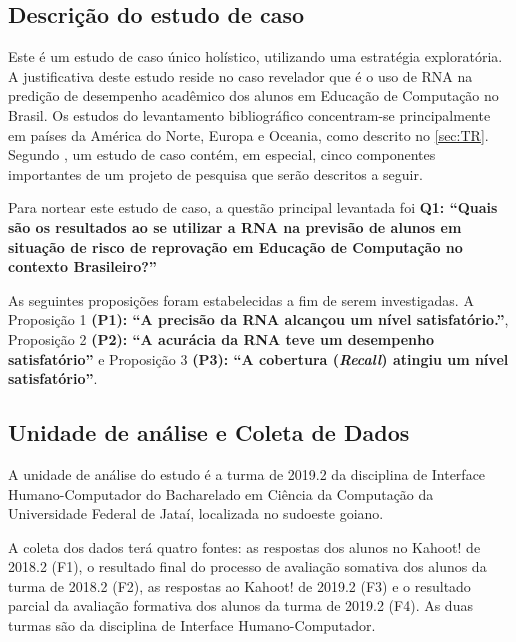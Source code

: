 \subsection{Descrição do estudo de caso}
Este é um estudo de caso único holístico, utilizando uma estratégia exploratória. A justiﬁcativa deste estudo reside no caso revelador que é o uso de RNA na predição de desempenho acadêmico dos alunos em Educação de Computação no Brasil. Os estudos do levantamento bibliográfico concentram-se principalmente em países da América do Norte, Europa e Oceania, como descrito no \autoref{sec:TR}.
Segundo , um estudo de caso contém, em especial, cinco componentes importantes de um projeto de pesquisa que serão descritos a seguir.

Para nortear este estudo de caso, a questão principal levantada foi \textbf{Q1: ``Quais são os resultados ao se utilizar a RNA na previsão de alunos em situação de risco de reprovação em Educação de Computação no contexto Brasileiro?''}

As seguintes proposições foram estabelecidas a fim de serem investigadas. A Proposição 1 \textbf{(P1): ``A precisão da RNA alcançou um nível satisfatório.''}, Proposição 2 \textbf{(P2): ``A acurácia da RNA teve um desempenho satisfatório''} e Proposição 3 \textbf{(P3): ``A cobertura (\textit{Recall}) atingiu um nível satisfatório''}.

\subsection{Unidade de análise e Coleta de Dados}
A unidade de análise do estudo é a turma de 2019.2 da disciplina de Interface Humano-Computador do Bacharelado em Ciência da Computação da Universidade Federal de Jataí, localizada no sudoeste goiano.

A coleta dos dados terá quatro fontes: as respostas dos alunos no Kahoot! de 2018.2 (F1), o resultado final do processo de avaliação somativa dos alunos da turma de 2018.2 (F2), as respostas ao Kahoot! de 2019.2 (F3) e o resultado parcial da avaliação formativa dos alunos da turma de 2019.2 (F4). As duas turmas são da disciplina de Interface Humano-Computador. 

